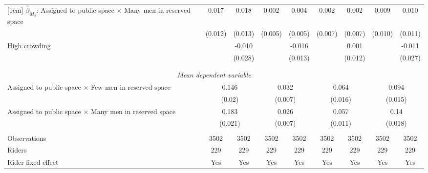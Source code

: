 \begin{tabular}{l*{8}{c}}
[1em]
$\hat\beta_{M_4}$: Assigned to public space $\times$ Many men in reserved space&       0.017         &       0.018         &       0.002         &       0.004         &       0.002         &       0.002         &       0.009         &       0.010         \\
                    &     (0.012)         &     (0.013)         &     (0.005)         &     (0.005)         &     (0.007)         &     (0.007)         &     (0.010)         &     (0.011)         \\
[1em]
High crowding       &                     &      -0.010         &                     &      -0.016         &                     &       0.001         &                     &      -0.011         \\
                    &                     &     (0.028)         &                     &     (0.013)         &                     &     (0.012)         &                     &     (0.027)         \\
\\[-1.8ex] \hline \\[-1.8ex] \multicolumn{9}{c}{\textit{Mean dependent variable}} \\ Assigned to public space $\times$ Few men in reserved space& \multicolumn{2}{c}{0.146} & \multicolumn{2}{c}{0.032} & \multicolumn{2}{c}{0.064} & \multicolumn{2}{c}{0.094} \\  & \multicolumn{2}{c}{(0.02)} & \multicolumn{2}{c}{(0.007)} & \multicolumn{2}{c}{(0.016)} & \multicolumn{2}{c}{(0.015)} \\ Assigned to public space $\times$ Many men in reserved space & \multicolumn{2}{c}{0.183} & \multicolumn{2}{c}{0.026} & \multicolumn{2}{c}{0.057} & \multicolumn{2}{c}{0.14} \\  & \multicolumn{2}{c}{(0.021)} & \multicolumn{2}{c}{(0.007)} & \multicolumn{2}{c}{(0.011)} & \multicolumn{2}{c}{(0.018)} \\\\[-1ex] 
Observations        &        3502         &        3502         &        3502         &        3502         &        3502         &        3502         &        3502         &        3502         \\
Riders              &         229         &         229         &         229         &         229         &         229         &         229         &         229         &         229         \\
Rider fixed effect  &         Yes         &         Yes         &         Yes         &         Yes         &         Yes         &         Yes         &         Yes         &         Yes         \\

\end{tabular}
